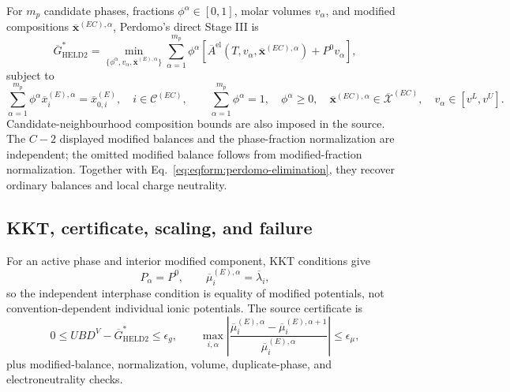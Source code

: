 \documentclass[11pt]{article}
\begin{document}
For \(m_p\) candidate phases, fractions \(\phi^\alpha\in[0,1]\), molar
volumes \(v_\alpha\), and modified compositions
\(\overline{\boldsymbol x}^{(EC),\alpha}\), Perdomo's direct Stage III is
\begin{equation}
 \overline G_{\mathrm{HELD2}}^{*}
 =\min_{\{\phi^\alpha,v_\alpha,\overline{\boldsymbol x}^{(E),\alpha}\}}
 \sum_{\alpha=1}^{m_p}\phi^\alpha
 \left[
 \overline A^{\mathrm{el}}
 (T,v_\alpha,\overline{\boldsymbol x}^{(EC),\alpha})
 +P^0v_\alpha
 \right],
\label{eq:eqform:perdomo-stage-three}
\end{equation}
subject to
\begin{equation}
 \sum_{\alpha=1}^{m_p}\phi^\alpha
 \overline x_i^{(E),\alpha}
 =\overline x_{0,i}^{(E)},\quad i\in\mathcal C^{(EC)},\qquad
 \sum_{\alpha=1}^{m_p}\phi^\alpha=1,\quad
 \phi^\alpha\geq0,\quad
 \overline{\boldsymbol x}^{(EC),\alpha}\in\overline{\mathcal X}^{(EC)},\quad
 v_\alpha\in[v^L,v^U].
\label{eq:eqform:perdomo-stage-three-constraints}
\end{equation}
Candidate-neighbourhood composition bounds are also imposed in the source.
The \(C-2\) displayed modified balances and the phase-fraction normalization
are independent; the omitted modified balance follows from modified-fraction
normalization. Together with Eq.~\eqref{eq:eqform:perdomo-elimination}, they
recover ordinary balances and local charge neutrality.

\subsection{KKT, certificate, scaling, and failure}

For an active phase and interior modified component, KKT conditions give
\begin{equation}
 P_\alpha=P^0,\qquad
 \overline\mu_i^{(E),\alpha}
 =\overline\lambda_i,
\label{eq:eqform:perdomo-kkt}
\end{equation}
so the independent interphase condition is equality of modified potentials,
not convention-dependent individual ionic potentials. The source certificate
is
\begin{equation}
 0\leq UBD^{V}-\overline G_{\mathrm{HELD2}}^{*}\leq\epsilon_g,\qquad
 \max_{i,\alpha}
 \left|
 \frac{\overline\mu_i^{(E),\alpha}
 -\overline\mu_i^{(E),\alpha+1}}
 {\overline\mu_i^{(E),\alpha}}
 \right|\leq\epsilon_\mu,
\label{eq:eqform:perdomo-certificate}
\end{equation}
plus modified-balance, normalization, volume, duplicate-phase, and
electroneutrality checks.
\end{document}
